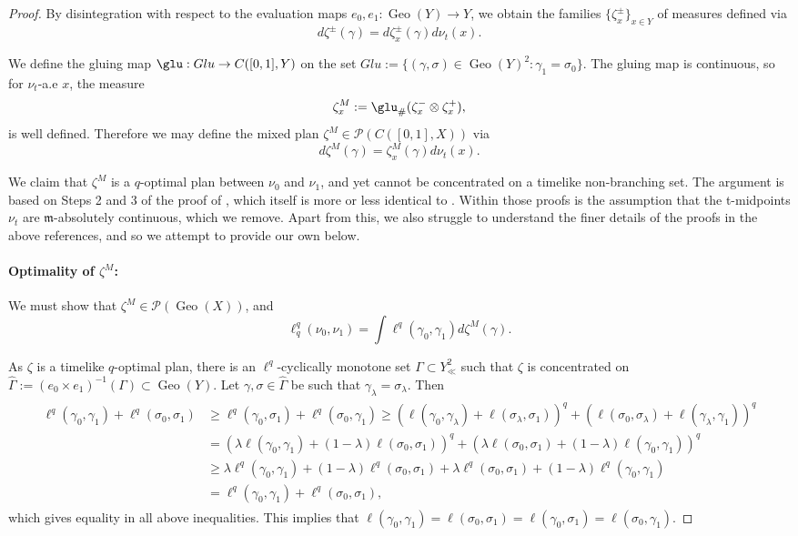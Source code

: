 \documentclass{article}
\newcommand{\m}{\mathfrak{m}}
\newcommand{\Pcal}{\mathcal{P}}
\DeclareMathOperator{\Geo}{Geo}
\theoremstyle{definition}
\begin{document}
{\begin{proof}
By disintegration with respect to the evaluation maps $e_0,e_1: \Geo(Y)\to Y$, we obtain the families $\{\zeta^{\pm}_x\}_{x\in Y}$ of measures defined via 
\[d\zeta^{\pm}(\gamma) = d\zeta^\pm_x(\gamma)d\nu_t(x).\]

We define the gluing map $\glu:Glu\to C([0,1],Y)$ on the set $Glu:=\{(\gamma,\sigma)\in \Geo(Y)^2: \gamma_1=\sigma_0\}$. The gluing map is continuous, so for $\nu_t$-a.e $x$, the measure
\[\zeta^M_x := \glu_\# (\zeta^-_x\otimes \zeta^+_x),\]
is well defined. Therefore we may define the mixed plan $\zeta^M\in \Pcal(C([0,1],X))$ via 
\[d\zeta^M(\gamma)= \zeta^M_x(\gamma)d\nu_t(x).\]


We claim that $\zeta^M$ is a $q$-optimal plan between $\nu_0$ and $\nu_1$, and yet cannot be concentrated on a timelike non-branching set. The argument is based on Steps 2 and 3 of the proof of \cite[Lem.\ 2.23; pp 68-70]{Braun}, which itself is more or less identical to \cite[\S 4]{RajalaSturm}. Within those proofs is the assumption that the t-midpoints $\nu_t$ are $\m$-absolutely continuous, which we remove. Apart from this, we also struggle to understand the finer details of the proofs in the above references, and so we attempt to provide our own below. 
\paragraph{Optimality of $\zeta^M$:}

We must show that $\zeta^M\in \Pcal(\Geo(X))$, and 
\[\ell_q^q(\nu_0,\nu_1)=\int \ell^q(\gamma_0, \gamma_1)d\zeta^M(\gamma). \]

As $\zeta$ is a timelike $q$-optimal plan, there is an $\ell^q$-cyclically monotone set $\Gamma\subset Y_\ll^2$ such that $\zeta$ is concentrated on $\hat\Gamma:= (e_0\times e_1)^{-1}(\Gamma)\subset \Geo(Y)$. Let $\gamma,\sigma\in \hat\Gamma$ be such that $\gamma_\lambda=\sigma_\lambda$. Then
\begin{align}\label{constantage}
\begin{split}
\ell^q(\gamma_0, \gamma_1)+\ell^q(\sigma_0, \sigma_1) &\geq \ell^q(\gamma_0, \sigma_1)+\ell^q(\sigma_0, \gamma_1) \geq \left(\ell(\gamma_0, \gamma_\lambda) +\ell(\sigma_\lambda, \sigma_1)\right)^q+ \left(\ell(\sigma_0, \sigma_\lambda) +\ell(\gamma_\lambda, \gamma_1)\right)^q \\
&= \left(\lambda\ell(\gamma_0, \gamma_1) +(1-\lambda)\ell(\sigma_0, \sigma_1)\right)^q+ \left(\lambda\ell(\sigma_0, \sigma_1) +(1-\lambda)\ell(\gamma_0, \gamma_1)\right)^q\\
&\geq \lambda\ell^q(\gamma_0, \gamma_1)+(1-\lambda)\ell^q(\sigma_0, \sigma_1)+ \lambda\ell^q(\sigma_0, \sigma_1)+(1-\lambda)\ell^q(\gamma_0, \gamma_1)\\
&= \ell^q(\gamma_0, \gamma_1)+\ell^q(\sigma_0, \sigma_1),
\end{split}
\end{align}
which gives equality in all above inequalities. This implies that $\ell(\gamma_0, \gamma_1)=\ell(\sigma_0,\sigma_1)=\ell(\gamma_0,\sigma_1)=\ell(\sigma_0,\gamma_1)$. 



\end{proof}}
\end{document}
